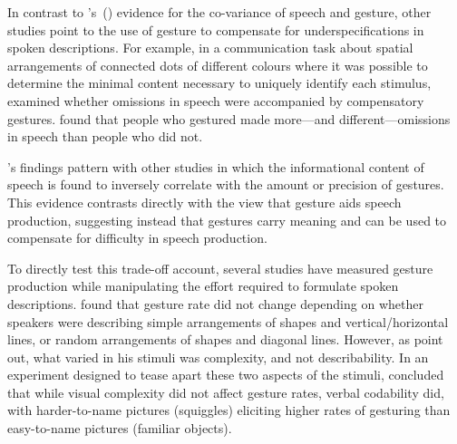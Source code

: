 \documentclass[a4paper,man,natbib]{apa6}
\newcommand*{\citegen}[1]{\citeauthor{#1}'s~(\citeyear{#1})}
\begin{document}



In contrast to \citegen{So2009} evidence for the co-variance of speech and gesture, other studies point to the use of gesture to compensate for underspecifications in spoken descriptions.
For example, in a communication task about spatial arrangements of connected dots of different colours where it was possible to determine the minimal content necessary to uniquely identify each stimulus, \citet{Melinger2004} examined whether omissions in speech were accompanied by compensatory gestures. 
\citeauthor{Melinger2004} found that people who gestured made more---and different---omissions in speech than people who did not. 

\citeauthor{Melinger2004}'s findings pattern with other studies \citep{Bangerter2004, DeRuiter2006, VanderSluis2007} in which the informational content of speech is found to inversely correlate with the amount or precision of gestures. 
This evidence contrasts directly with the view that gesture aids speech production, suggesting instead that gestures carry meaning and can be used to compensate for difficulty in speech production. 

To directly test this trade-off account, several studies have measured gesture production while manipulating the effort required to formulate spoken descriptions. 
\citet{DeRuiter1998} found that gesture rate did not change depending on whether speakers were describing simple arrangements of shapes and vertical/horizontal lines, or random arrangements of shapes and diagonal lines.
However, as \citet{Morsella2004} point out, what \citeauthor{DeRuiter1998} varied in his stimuli was complexity, and not describability. 
In an experiment designed to tease apart these two aspects of the stimuli, \citet{Morsella2004} concluded that while visual complexity did not affect gesture rates, verbal codability did, with harder-to-name pictures (squiggles) eliciting higher rates of gesturing than easy-to-name pictures (familiar objects).
\end{document}
